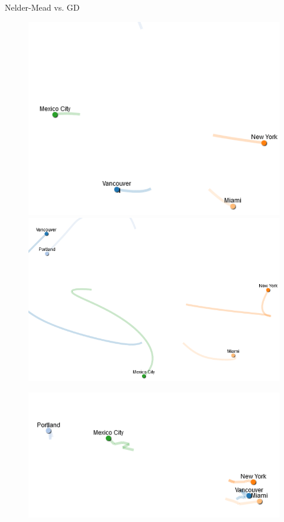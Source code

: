 \documentclass[11pt,compress,t,notes=noshow, xcolor=table]{beamer}
\begin{document}
\begin{vbframe}{Nelder-Mead vs. GD}
\framebreak
\vspace*{-0.8cm}
\begin{figure}
    \centering
    \begin{minipage}{0.45\textwidth}
        \centering
        \includegraphics[width = 0.8\linewidth]{figure_man/nm_gd_cities_5.PNG}
    \end{minipage}\hfill
    \begin{minipage}{0.45\textwidth}
        \centering
        \includegraphics[width = 0.8\linewidth]{figure_man/nm_gd_cities_6.PNG}
    \end{minipage}
\end{figure}
\begin{figure}
    \centering
    \begin{minipage}{0.45\textwidth}
        \centering
        \includegraphics[width = 0.8\linewidth]{figure_man/nm_gd_cities_7.PNG}

\end{minipage}
\end{figure}
\end{vbframe}
\end{document}
